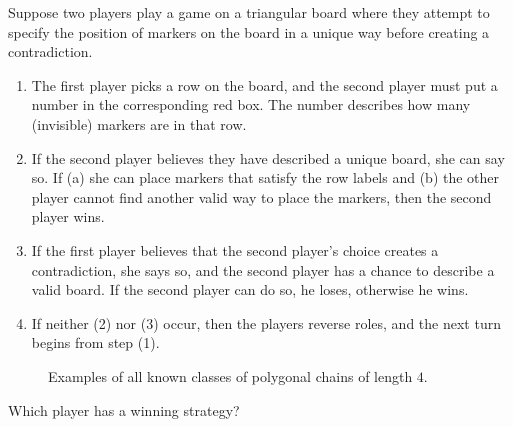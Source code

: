 \documentclass{article}
\begin{document}
  Suppose two players play a game on a triangular board where they attempt to
  specify the position of markers on the board in a unique way before creating a
  contradiction.
  \begin{enumerate}[(1)]
    \item The first player picks a row on the board, and the second player must
      put a number in the corresponding red box. The number describes how many
      (invisible) markers are in that row.
    \item If the second player believes they have described a unique board, she
      can say so. If (a) she can place markers that satisfy the row labels and
      (b) the other player cannot find another valid way to place the markers,
      then the second player wins.
    \item If the first player believes that the second player's choice creates a
      contradiction, she says so, and the second player has a chance to describe
      a valid board. If the second player can do so, he loses, otherwise he
      wins.
    \item If neither (2) nor (3) occur, then the players reverse roles, and the
    next turn begins from step (1).
  \end{enumerate}
  \begin{figure}[ht!]
    \centering
    \caption{
      Examples of all known classes of polygonal chains of length $4$.
    }
  \end{figure}
  \begin{question}
    Which player has a winning strategy?
  \end{question}
\end{document}
